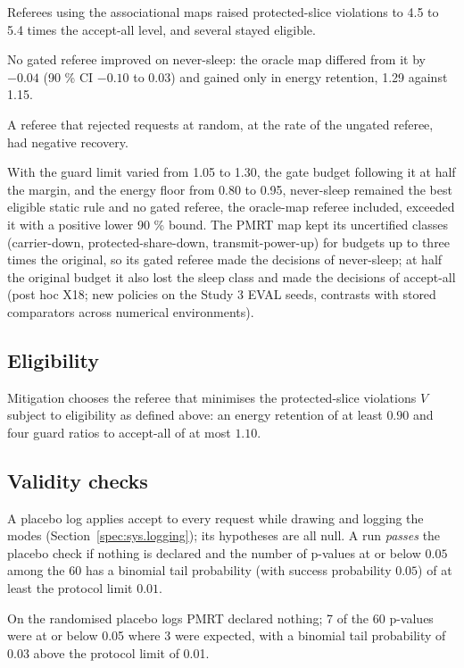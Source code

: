 Referees using the associational maps raised protected-slice violations to 4.5 to 5.4 times the accept-all level, and several stayed eligible.

No gated referee improved on never-sleep: the oracle map differed from it by $-0.04$ (90 \% CI $-0.10$ to $0.03$) and gained only in energy retention, 1.29 against 1.15.

A referee that rejected requests at random, at the rate of the ungated referee, had negative recovery.

With the guard limit varied from 1.05 to 1.30, the gate budget following it at half the margin, and the energy floor from 0.80 to 0.95, never-sleep remained the best eligible static rule and no gated referee, the oracle-map referee included, exceeded it with a positive lower 90 \% bound. The PMRT map kept its uncertified classes (carrier-down, protected-share-down, transmit-power-up) for budgets up to three times the original, so its gated referee made the decisions of never-sleep; at half the original budget it also lost the sleep class and made the decisions of accept-all (post hoc X18; new policies on the Study 3 EVAL seeds, contrasts with stored comparators across numerical environments).

\subsection{Eligibility}
\label{spec:met.eligible}

Mitigation chooses the referee that minimises the protected-slice violations $V$ subject to eligibility as defined above: an energy retention of at least $0.90$ and four guard ratios to accept-all of at most $1.10$.

\subsection{Validity checks}
\label{spec:met.validity}

A placebo log applies accept to every request while drawing and logging the modes (Section~\ref{spec:sys.logging}); its hypotheses are all null. A run \emph{passes} the placebo check if nothing is declared and the number of p-values at or below $0.05$ among the $60$ has a binomial tail probability (with success probability $0.05$) of at least the protocol limit $0.01$.

On the randomised placebo logs PMRT declared nothing; 7 of the 60 p-values were at or below 0.05 where 3 were expected, with a binomial tail probability of 0.03 above the protocol limit of 0.01.

